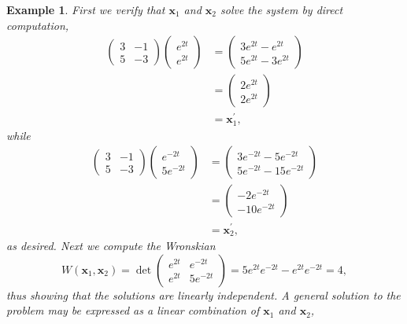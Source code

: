 \documentclass[11pt]{amsart}
\newtheorem{example}{Example}
\numberwithin{equation}{section}
\begin{document}
\begin{example}
First we verify that $\mathbf{x}_1$ and $\mathbf{x}_2$ solve the system by direct computation, 
\begin{align*}
\left(
\begin{matrix}
3 & -1 \\
5 & -3
\end{matrix}
\right)
\left(
\begin{matrix}
e^{2t}\\
e^{2t}
\end{matrix}
\right) & = \left(
\begin{matrix}
3e^{2t}-e^{2t}\\
5e^{2t}-3e^{2t}
\end{matrix}
\right) \\
& = \left(
\begin{matrix}
2e^{2t}\\
2e^{2t}
\end{matrix}
\right) \\
&= \mathbf{x}_{1}^{'},
\end{align*}
while
\begin{align*}
\left(
\begin{matrix}
3 & -1 \\
5 & -3
\end{matrix}
\right)
\left(
\begin{matrix}
e^{-2t}\\
5e^{-2t}
\end{matrix}
\right) & = \left(
\begin{matrix}
3e^{-2t}-5e^{-2t}\\
5e^{-2t}-15e^{-2t}
\end{matrix}
\right) \\
& = \left(
\begin{matrix}
-2e^{-2t}\\
-10e^{-2t}
\end{matrix}
\right) \\
&= \mathbf{x}_{2}^{'},
\end{align*}
as desired. Next we compute the Wronskian
\begin{equation*}
W(\mathbf{x}_1, \mathbf{x}_2) = \det \left(
\begin{matrix}
e^{2t} & e^{-2t}\\
e^{2t} & 5e^{-2t}
\end{matrix}
\right) = 5e^{2t}e^{-2t}-e^{2t}e^{-2t}=4,
\end{equation*}
thus showing that the solutions are linearly independent. A general solution to the problem may be expressed as a linear combination of $\mathbf{x}_1$ and $\mathbf{x}_2$,

\end{example}
\end{document}
